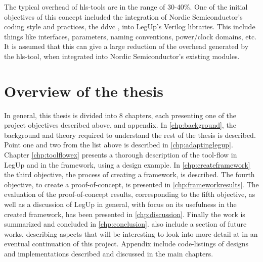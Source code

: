 \begin{enumerate}
 The typical overhead of \gls{hls}-tools are in the range of 30-40\%. One of the initial objectives of this concept included the integration of  Nordic Semiconductor's coding style and practices, the \gls{ddvc} \cite{nordicddvc}, into LegUp's Verilog libraries. This include things like interfaces, parameters, naming conventions, power/clock domains, etc. It is assumed that this can give a large reduction of the overhead generated by the \gls{hls}-tool, when integrated into Nordic Semiconductor's existing modules.
\end{enumerate}

\section{Overview of the thesis}
In general, this thesis is divided into 8 chapters, each presenting one of the project objectives described above, and appendix. In \cref{chp:background}, the background and theory required to understand the rest of the thesis is described. Point one and two from the list above is described in \cref{chp:adaptinglegup}. Chapter \ref{chp:toolflowex} presents a thorough description of the tool-flow in LegUp and in the framework, using a design example. In \cref{chp:createframework} the third objective, the process of creating a framework, is described. The fourth objective, to create a proof-of-concept, is presented in \cref{chp:frameworkresults}. The evaluation of the proof-of-concept results, corresponding to the fifth objective, as well as a discussion of LegUp in general, with focus on its usefulness in the created framework, has been presented in \cref{chp:discussion}. Finally the work is summarized and concluded in \cref{chp:conclusion}.  also include a section of future works, describing aspects that will be interesting to look into more detail at in an eventual continuation of this project. Appendix include code-listings of designs and implementations described and discussed in the main chapters.
